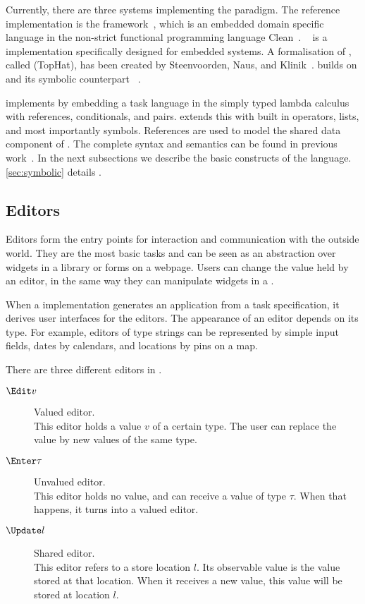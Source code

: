 Currently, there are three systems implementing the \TOP paradigm.
The reference implementation is the \ITASKS framework~\cite{DBLP:conf/ppdp/PlasmeijerLMAK12},
which is an embedded domain specific language in the non-strict functional programming language Clean~\cite{plasmeijer2002clean}.
\MTASKS~\cite{DBLP:conf/cgo/KoopmanLP18} is a \TOP implementation specifically designed for embedded systems.
A formalisation of \TOP, called \TOPHAT (TopHat), has been created by Steenvoorden, Naus, and Klinik~\cite{DBLP:conf/ppdp/SteenvoordenNK19}.
\ASTOPHAT builds on \TOPHAT and its symbolic counterpart \STOPHAT~\cite{Naus2019}.

\TOPHAT implements \TOP by embedding a task language in the simply typed lambda calculus with references, conditionals, and pairs.
\STOPHAT extends this with built in operators, lists, and most importantly symbols.
References are used to model the shared data component of \TOP.
The complete syntax and semantics can be found in previous work~\cite{DBLP:conf/ppdp/SteenvoordenNK19}.
In the next subsections we describe the basic constructs of the \TOPHAT language.
\cref{sec:symbolic} details \STOPHAT.


\subsection{Editors}
\label{sub:editors}

Editors form the entry points for interaction and communication with the outside world.
They are the most basic tasks and can be seen as an abstraction over widgets in a \GUI library or forms on a webpage.
Users can change the value held by an editor, in the same way they can manipulate widgets in a \GUI.

When a \TOP implementation generates an application from a task specification, it derives user interfaces for the editors.
The appearance of an editor depends on its type.
For example, editors of type strings can be represented by simple input fields, dates by calendars, and locations by pins on a map.

There are three different editors in \TOPHAT.
\begin{description}
  \item[$\Edit v$] Valued editor.\\
    This editor holds a value $v$ of a certain type.
    The user can replace the value by new values of the same type.
  \item[$\Enter \tau$] Unvalued editor.\\
    This editor holds no value, and can receive a value of type $\tau$.
    When that happens, it turns into a valued editor.
  \item[$\Update l$] Shared editor.\\
    This editor refers to a store location $l$.
    Its observable value is the value stored at that location.
    When it receives a new value, this value will be stored at location $l$.
\end{description}


